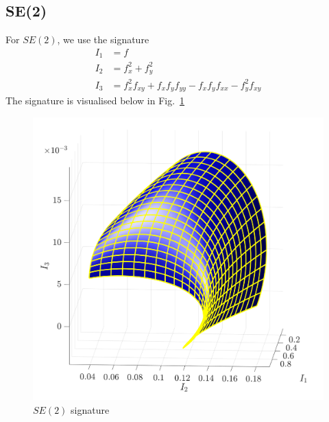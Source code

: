 \documentclass[11pt]{article}
\begin{document}
\subsection{SE(2)}
For $SE(2)$, we use the signature
\begin{equation}\label{eq:se2sig}
  \begin{split}
    I_1 &= f \\
    I_2 &= f_x^2 + f_y^2 \\
    I_3 &= f_x^2 f_{xy} + f_x f_y f_{yy} - f_x f_y f_{xx} - f_y^2 f_{xy}
  \end{split}
\end{equation}
The signature is visualised below in Fig.~\ref{fig:se2signature}
\begin{figure}
  \centering
    \includegraphics[width=12cm]{figures/SE2_signature}
  \caption{$SE(2)$ signature}
  \label{fig:se2signature}
\end{figure}
\end{document}
